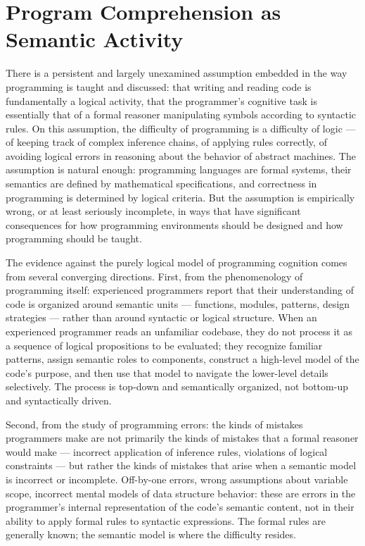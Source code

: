 \documentclass[12pt,openany]{book}
\theoremstyle{plain}
\theoremstyle{definition}
\theoremstyle{remark}
\begin{document}
\section{Program Comprehension as Semantic Activity}

There is a persistent and largely unexamined assumption embedded in the way programming is taught and discussed: that writing and reading code is fundamentally a logical activity, that the programmer's cognitive task is essentially that of a formal reasoner manipulating symbols according to syntactic rules. On this assumption, the difficulty of programming is a difficulty of logic — of keeping track of complex inference chains, of applying rules correctly, of avoiding logical errors in reasoning about the behavior of abstract machines. The assumption is natural enough: programming languages are formal systems, their semantics are defined by mathematical specifications, and correctness in programming is determined by logical criteria. But the assumption is empirically wrong, or at least seriously incomplete, in ways that have significant consequences for how programming environments should be designed and how programming should be taught.

The evidence against the purely logical model of programming cognition comes from several converging directions. First, from the phenomenology of programming itself: experienced programmers report that their understanding of code is organized around semantic units — functions, modules, patterns, design strategies — rather than around syntactic or logical structure. When an experienced programmer reads an unfamiliar codebase, they do not process it as a sequence of logical propositions to be evaluated; they recognize familiar patterns, assign semantic roles to components, construct a high-level model of the code's purpose, and then use that model to navigate the lower-level details selectively. The process is top-down and semantically organized, not bottom-up and syntactically driven.

Second, from the study of programming errors: the kinds of mistakes programmers make are not primarily the kinds of mistakes that a formal reasoner would make — incorrect application of inference rules, violations of logical constraints — but rather the kinds of mistakes that arise when a semantic model is incorrect or incomplete. Off-by-one errors, wrong assumptions about variable scope, incorrect mental models of data structure behavior: these are errors in the programmer's internal representation of the code's semantic content, not in their ability to apply formal rules to syntactic expressions. The formal rules are generally known; the semantic model is where the difficulty resides.
\end{document}
